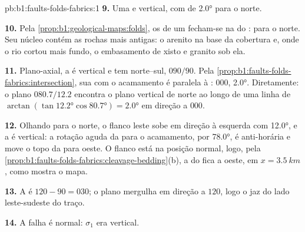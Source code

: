 \begin{solution}{pb:b1:faults-folds-fabrics:1}
\textbf{9.} Uma  e vertical, com  de \ang{2.0} para o norte.

\textbf{10.} Pela \cref{prop:b1:geological-maps:folds}, os  de um  fecham-se na  do : para o norte. Seu núcleo contém as rochas mais antigas: o arenito na base da cobertura e, onde o rio cortou mais fundo, o embasamento de xisto e granito sob ela.

\textbf{11.} Plano-axial, a  é vertical e tem  norte--sul, $090/90$. Pela \cref{prop:b1:faults-folds-fabrics:intersection}, sua  com o acamamento é paralela à :  $000$,  \ang{2.0}. Diretamente: o plano $080.7/12.2$ encontra o plano vertical de  norte ao longo de uma linha de  $\arctan(\tan\ang{12.2}
\cos\ang{80.7}) = \ang{2.0}$ em direção a $000$.

\textbf{12.} Olhando para o norte, o flanco leste sobe em direção à esquerda com \ang{12.0}, e a  é vertical: a rotação aguda da  para o acamamento, por \ang{78.0}, é anti-horária e move o topo da  para oeste. O flanco está na posição normal, logo, pela \cref{prop:b1:faults-folds-fabrics:cleavage-bedding}(b), a  do  fica a oeste, em $x = \qty{3.5}{km}$, como mostra o mapa.

\textbf{13.} A  é $120 - 90 = 030$; o plano mergulha em direção a $120$, logo o  jaz do lado leste-sudeste do traço.

\textbf{14.} A falha é normal: $\sigma_1$ era vertical.


\end{solution}
